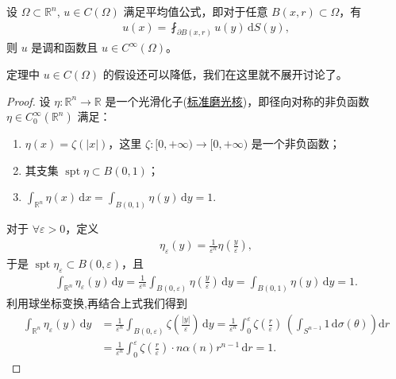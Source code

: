 \documentclass[../../main.tex]{subfiles}%
\begin{document}
\begin{theorem}\label{theorem:theorem:调和函数平均值定理逆命题-u弱化成连续}
设 $\Omega\subset \mathbb{R}^n$, $u\in C(\Omega)$ 满足平均值公式，即对于任意 $B(x,r)\subset\Omega$，有
\begin{align*}
u(x) = \fint_{\partial B(x,r)} u(y)\,\mathrm{d}S(y),
\end{align*}
则 $u$ 是调和函数且 $u\in C^\infty(\Omega)$。
\end{theorem}
\begin{remark}
定理中 $u\in C(\Omega)$ 的假设还可以降低，我们在这里就不展开讨论了。
\end{remark}
\begin{proof}
设 $\eta:\mathbb{R}^n\to\mathbb{R}$ 是一个光滑化子(\hyperref[Real Analysis-definition:标准磨光核]{标准磨光核})，即径向对称的非负函数 $\eta\in C_0^\infty(\mathbb{R}^n)$ 满足：
\begin{enumerate}[(1)]
\item $\eta(x)=\zeta(|x|)$，这里 $\zeta:[0,+\infty)\to[0,+\infty)$ 是一个非负函数；
\item 其支集 $\operatorname{spt}\eta\subset B(0,1)$；
\item $\int_{\mathbb{R}^n}\eta(x)\,\mathrm{d}x = \int_{B(0,1)}\eta(y)\,\mathrm{d}y = 1$.
\end{enumerate}
对于 $\forall \varepsilon>0$，定义
\begin{align*}
\eta_\varepsilon(y) = \frac{1}{\varepsilon^n}\eta\left(\frac{y}{\varepsilon}\right),
\end{align*}
于是 $\operatorname{spt}\eta_\varepsilon\subset B(0,\varepsilon)$，且
\begin{align*}
\int_{\mathbb{R}^n}\eta_\varepsilon(y)\,\mathrm{d}y
= \frac{1}{\varepsilon^n}\int_{B(0,\varepsilon)} \eta\left(\frac{y}{\varepsilon}\right)\,\mathrm{d}y 
= \int_{B(0,1)}\eta(y)\,\mathrm{d}y = 1.
\end{align*}
利用球坐标变换,再结合上式我们得到
\begin{align}
\int_{\mathbb{R} ^n}{\eta _{\varepsilon}(y)\,\mathrm{d}y}&=\frac{1}{\varepsilon ^n}\int_{B(0,\varepsilon )}{\zeta \left( \frac{\left| y \right|}{\varepsilon} \right) \,\mathrm{d}y}=\frac{1}{\varepsilon ^n}\int_0^{\varepsilon}{\zeta \left( \frac{r}{\varepsilon} \right) \,\left( \int_{S^{n-1}}{1\,}\mathrm{d}\sigma \left( \theta \right) \right) \mathrm{d}r} \nonumber 
\\
&=\frac{1}{\varepsilon ^n}\int_0^{\varepsilon}{\zeta \left( \frac{r}{\varepsilon} \right)}\cdot n\alpha (n)r^{n-1}\,\mathrm{d}r=1.\label{eq::hjijeioefjwjfiowejiefi2324}

\end{align}
\end{proof}
\end{document}
